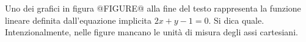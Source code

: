 Uno dei grafici in figura 
@FIGURE@ alla fine del testo
rappresenta la funzione lineare definita dall’equazione implicita \( \displaystyle 2x+y-1=0\). Si dica quale.
Intenzionalmente, nelle figure mancano le unità di misura degli assi cartesiani. %
